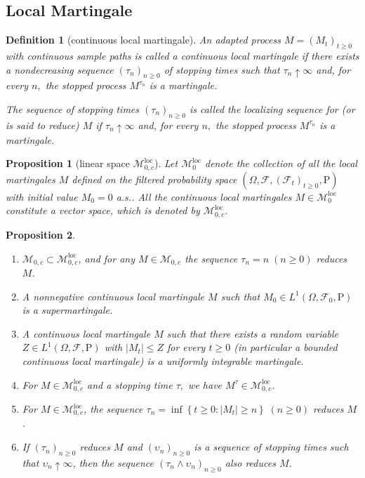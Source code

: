 \documentclass{article}
\newtheorem{definition}{Definition}[section]
\newtheorem{proposition}{Proposition}[section]
\theoremstyle{nonumberplain}
\begin{document}
\subsection{Local Martingale}
\begin{definition}[continuous local martingale]
	An adapted process $M=\left(M_{t}\right)_{t \geq 0}$ with continuous sample paths is called a \emph{continuous local martingale} if there exists a nondecreasing sequence $\left(\tau_{n}\right)_{n \geq 0}$ of stopping times such that $\tau_{n} \uparrow \infty$ and, for every $n,$ the stopped process $M^{\tau_{n}}$ is a martingale.
	
	The sequence of stopping times $\left(\tau_{n}\right)_{n\ge0}$ is called the \emph{localizing sequence}
	for (or is said to reduce) $M$ if $\tau_{n} \uparrow \infty$ and, for every $n,$ the stopped process $M^{\tau_{n}}$ is a martingale.
\end{definition}


\begin{proposition}[linear space $\mathscr{M}^{\mathrm{loc}}_{0,c}$]
	Let $\mathscr{M}_0^{\mathrm{loc}}$ denote the collection of all the local martingales $M$ defined on the filtered probability space $(\Omega,\mathcal{F},(\mathcal{F}_{t})_{t\ge0},\mathrm{P})$ with initial value $M_0=0$ a.s.. All the continuous local martingales $M\in\mathscr{M}^{\mathrm{loc}}_{0}$ constitute a vector space, which is denoted by $\mathscr{M}^{\mathrm{loc}}_{0,c}$.
\end{proposition}

\begin{proposition}~\\
	\begin{enumerate}
		\item $\mathscr{M}_{0,c}\subset\mathscr{M}^{\mathrm{loc}}_{0,c}$, and for any $M\in\mathscr{M}_{0,c}$ the sequence $\tau_{n}=n\;(n\ge0)$ reduces $M$. 
		\item A nonnegative continuous local martingale $M$ such that $M_{0} \in L^{1}(\Omega,\mathcal{F}_0,\mathrm{P})$ is a supermartingale.
		\item A continuous local martingale $M$ such that there exists a random variable $Z \in L^{1}(\Omega,\mathcal{F},\mathrm{P})$ with $\left|M_{t}\right| \leq Z$ for every $t \geq 0$ (in particular a bounded continuous local martingale) is a uniformly integrable martingale.
		\item For $M \in \mathscr{M}^{\mathrm{loc}}_{0,c}$ and a stopping time $\tau,$ we have $M^{\tau} \in \mathscr{M}^{\mathrm{loc}}_{0,c}$.
		\item For $M \in \mathscr{M}^{\mathrm{loc}}_{0,c}$, the sequence
		$\tau_{n}=\inf \left\{t \geq 0:\left|M_{t}\right| \geq n\right\}\;(n\ge0)$	reduces $M$.
		\item If $\left(\tau_{n}\right)_{n\ge0}$ reduces $M$ and $\left(\upsilon_{n}\right)_{n\ge0}$ is a sequence of stopping times such that $\upsilon_{n} \uparrow \infty$, then the sequence $\left(\tau_{n} \wedge \upsilon_{n}\right)_{n\ge0}$ also reduces $M$.
	\end{enumerate}
\end{proposition}
\end{document}
